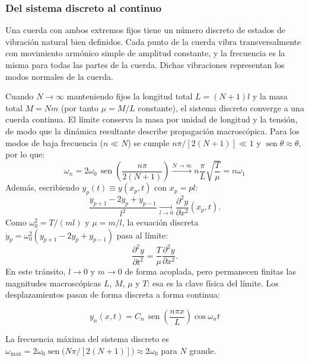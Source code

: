 \documentclass[12pt, a4paper]{article}
\theoremstyle{plain}
\theoremstyle{definition}
\theoremstyle{remark}
\DeclareMathOperator{\sen}{sen}
\begin{document}
\subsubsection{Del sistema discreto al continuo}

Una cuerda con ambos extremos fijos tiene un número discreto de estados de vibración
natural bien definidos. Cada punto de la cuerda vibra transversalmente con movimiento
armónico simple de amplitud constante, y la frecuencia es la misma para todas las partes
de la cuerda. Dichas vibraciones representan los modos normales de la cuerda.

Cuando $N\to\infty$ manteniendo fijos la longitud total $L = (N+1)l$ y la masa total
$M = Nm$ (por tanto $\mu = M/L$ constante), el sistema discreto converge a una cuerda
continua. El límite conserva la masa por unidad de longitud y la tensión, de modo que la
dinámica resultante describe propagación macroscópica. Para los modos de baja frecuencia
($n \ll N$) se cumple
$n\pi/[2(N+1)] \ll 1$ y $\sen\theta \approx \theta$, por lo que:
\begin{equation}
  \omega_n = 2\omega_0\,\sen\!\left(\frac{n\pi}{2(N+1)}\right)
  \xrightarrow{N\to\infty}
  n\frac{\pi}{L}\sqrt{\frac{T}{\mu}} = n\omega_1
\end{equation}
Además, escribiendo $y_p(t)\equiv y(x_p,t)$ con $x_p=pl$:
\begin{equation}
  \frac{y_{p+1}-2y_p+y_{p-1}}{l^2}
  \xrightarrow[l\to 0]{}
  \frac{\partial^2 y}{\partial x^2}(x_p,t).
\end{equation}
Como $\omega_0^2=T/(ml)$ y $\mu=m/l$, la ecuación discreta
$\ddot y_p=\omega_0^2(y_{p+1}-2y_p+y_{p-1})$ pasa al límite:
\begin{equation}
  \frac{\partial^2 y}{\partial t^2}
  =\frac{T}{\mu}\frac{\partial^2 y}{\partial x^2}.
\end{equation}
En este tránsito, $l\to0$ y $m\to0$ de forma acoplada, pero permanecen finitas las
magnitudes macroscópicas $L$, $M$, $\mu$ y $T$: esa es la clave física del límite.
Los desplazamientos pasan de forma discreta a forma continua:
\begin{mdframed}[style=resultado]
\begin{equation}
  y_n(x,t) = C_n\,\sen\!\left(\frac{n\pi x}{L}\right)\cos\omega_n t
\end{equation}
\end{mdframed}

La frecuencia máxima del sistema discreto es
$\omega_{\max} = 2\omega_0\sen\!\bigl(N\pi/[2(N+1)]\bigr) \approx 2\omega_0$ para $N$
grande.
\end{document}
